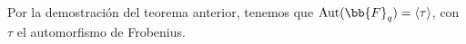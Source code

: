 Por la demostración del teorema anterior, tenemos que $\Aut(\bb{F}_q) = \langle \tau\rangle$, con $\tau$ el automorfismo de Frobenius.

